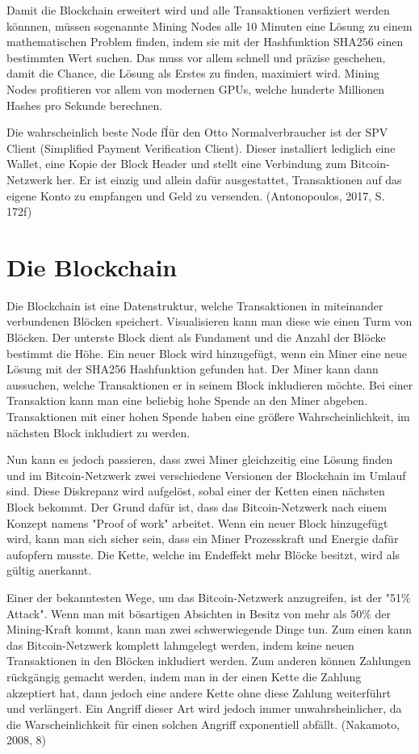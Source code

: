 Damit die Blockchain erweitert wird und alle Transaktionen verfiziert werden könnnen, müssen sogenannte Mining Nodes alle 10 Minuten
eine Lösung zu einem mathematischen Problem finden, indem sie mit der Hashfunktion SHA256 einen bestimmten Wert suchen. Das muss
vor allem schnell und präzise geschehen, damit die Chance, die Lösung als Erstes zu finden, maximiert wird. Mining Nodes 
profitieren vor allem von modernen GPUs, welche hunderte Millionen Hashes pro Sekunde berechnen.

Die wahrscheinlich beste Node fÍür den Otto Normalverbraucher ist der SPV Client (Simplified Payment Verification Client). Dieser
installiert lediglich eine Wallet, eine Kopie der Block Header und stellt eine Verbindung zum Bitcoin-Netzwerk her. Er ist einzig
und allein dafür ausgestattet, Transaktionen auf das eigene Konto zu empfangen und Geld zu versenden. (Antonopoulos, 2017, S. 172f)


\section{Die Blockchain}
Die Blockchain ist eine Datenstruktur, welche Transaktionen in miteinander verbundenen Blöcken speichert. Visualisieren kann man
diese wie einen Turm von Blöcken. Der unterste Block dient als Fundament und die Anzahl der Blöcke bestimmt die Höhe. Ein neuer
Block wird hinzugefügt, wenn ein Miner eine neue Lösung mit der SHA256 Hashfunktion gefunden hat. Der Miner kann dann aussuchen,
welche Transaktionen er in seinem Block inkludieren möchte. Bei einer Transaktion kann man eine beliebig hohe Spende an den Miner
abgeben. Transaktionen mit einer hohen Spende haben eine größere Wahrscheinlichkeit, im nächsten Block inkludiert zu werden.

Nun kann es jedoch passieren, dass zwei Miner gleichzeitig eine Lösung finden und im Bitcoin-Netzwerk zwei verschiedene Versionen
der Blockchain im Umlauf sind. Diese Diskrepanz wird aufgelöst, sobal einer der Ketten einen nächsten Block bekommt. Der Grund
dafür ist, dass das Bitcoin-Netzwerk nach einem Konzept namens "Proof of work" arbeitet. Wenn ein neuer Block hinzugefügt wird,
kann man sich sicher sein, dass ein Miner Prozesskraft und Energie dafür aufopfern musste. Die Kette, welche im Endeffekt mehr
Blöcke besitzt, wird als gültig anerkannt.

Einer der bekanntesten Wege, um das Bitcoin-Netzwerk anzugreifen, ist der "51\% Attack". Wenn man mit bösartigen Absichten
in Besitz von mehr als 50\% der Mining-Kraft kommt, kann man zwei schwerwiegende Dinge tun. Zum einen kann das Bitcoin-Netzwerk
komplett lahmgelegt werden, indem keine neuen Transaktionen in den Blöcken inkludiert werden. Zum anderen können Zahlungen
rückgängig gemacht werden, indem man in der einen Kette die Zahlung akzeptiert hat, dann jedoch eine andere Kette ohne diese 
Zahlung weiterführt und verlängert. Ein Angriff dieser Art wird jedoch immer unwahrsheinlicher, da die Warscheinlichkeit für
einen solchen Angriff exponentiell abfällt. (Nakamoto, 2008, 8)

